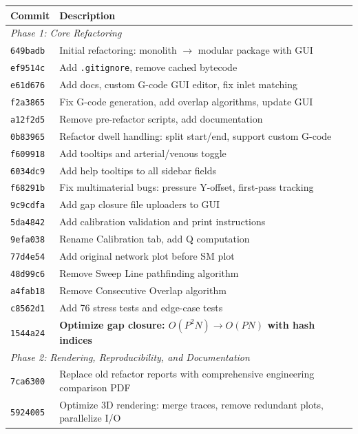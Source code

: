 \documentclass[11pt,a4paper]{article}
\begin{document}
\begin{longtable}{lp{11cm}}
\toprule
\textbf{Commit} & \textbf{Description} \\
\midrule
\endhead
\multicolumn{2}{l}{\textit{Phase 1: Core Refactoring}} \\
\midrule
\texttt{649badb} & Initial refactoring: monolith $\rightarrow$ modular package with GUI \\
\texttt{ef9514c} & Add \texttt{.gitignore}, remove cached bytecode \\
\texttt{e61d676} & Add docs, custom G-code GUI editor, fix inlet matching \\
\texttt{f2a3865} & Fix G-code generation, add overlap algorithms, update GUI \\
\texttt{a12f2d5} & Remove pre-refactor scripts, add documentation \\
\texttt{0b83965} & Refactor dwell handling: split start/end, support custom G-code \\
\texttt{f609918} & Add tooltips and arterial/venous toggle \\
\texttt{6034dc9} & Add help tooltips to all sidebar fields \\
\texttt{f68291b} & Fix multimaterial bugs: pressure Y-offset, first-pass tracking \\
\texttt{9c9cdfa} & Add gap closure file uploaders to GUI \\
\texttt{5da4842} & Add calibration validation and print instructions \\
\texttt{9efa038} & Rename Calibration tab, add Q computation \\
\texttt{77d4e54} & Add original network plot before SM plot \\
\texttt{48d99c6} & Remove Sweep Line pathfinding algorithm \\
\texttt{a4fab18} & Remove Consecutive Overlap algorithm \\
\texttt{c8562d1} & Add 76 stress tests and edge-case tests \\
\texttt{1544a24} & \textbf{Optimize gap closure: $O(P^2 N) \rightarrow O(PN)$ with hash indices} \\
\midrule
\multicolumn{2}{l}{\textit{Phase 2: Rendering, Reproducibility, and Documentation}} \\
\midrule
\texttt{7ca6300} & Replace old refactor reports with comprehensive engineering comparison PDF \\
\texttt{5924005} & Optimize 3D rendering: merge traces, remove redundant plots, parallelize I/O \\

\end{longtable}
\end{document}

